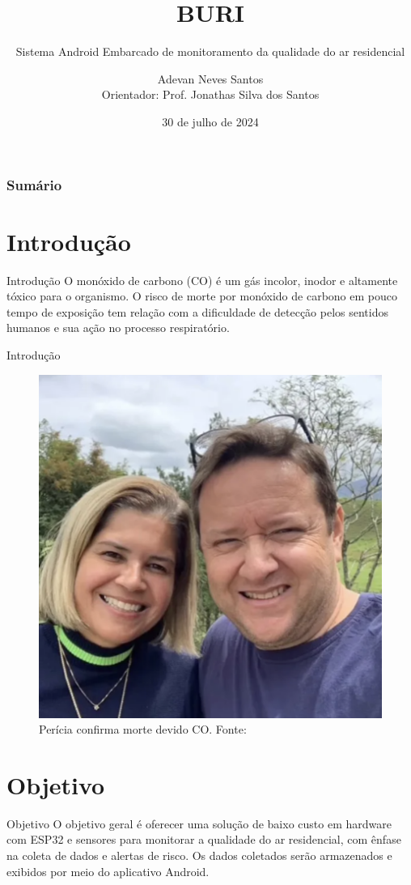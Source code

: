 \documentclass[12pt]{beamer}
\title{BURI}
\subtitle{Sistema Android Embarcado de monitoramento da qualidade do ar residencial}
\author{Adevan Neves Santos \\ Orientador: Prof. Jonathas Silva dos Santos}
\date{30 de julho de 2024}
\begin{document}
    \maketitle

    \begin{frame}
        \frametitle{Sumário}
        \tableofcontents
    \end{frame}

    \section{Introdução}

    \begin{frame}{Introdução}
         O monóxido de carbono (CO) é um gás incolor, inodor e altamente tóxico para o organismo. O risco de morte por monóxido de carbono em pouco tempo de exposição tem relação com a dificuldade de detecção pelos sentidos humanos e sua ação no processo respiratório. 
    \end{frame}
    
    \begin{frame}{Introdução}
        \begin{figure}
            \centering
            \includegraphics[width=0.50\linewidth]{morte-casal.png}
            \caption{Perícia confirma morte devido CO. Fonte: \cite{morteCO}}
            \label{fig:f1}
        \end{figure}
    \end{frame}

    \section{Objetivo}

    \begin{frame}{Objetivo}
        O objetivo geral é oferecer uma solução de baixo custo em hardware com  ESP32 e sensores para monitorar a qualidade do ar residencial, com ênfase na coleta de dados e alertas  de risco. Os dados coletados serão armazenados e exibidos por meio do aplicativo Android.
    \end{frame}
\end{document}
